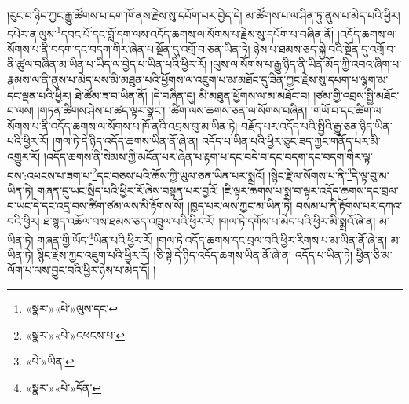 །རུང་བ་ཉིད་ཀྱང་རྒྱུ་ཚོགས་པ་དག་ཁོ་ནས་རྗེས་སུ་དཔོག་པར་བྱེད་དེ། མ་ཚོགས་པ་ལ་ཤིན་ཏུ་ནུས་པ་མེད་པའི་ཕྱིར། དཔེར་ན་ལུས་\footnote{«སྣར་»«པེ་»ལུས་དང་}དབང་པོ་དང་བློ་དག་ལས་འདོད་ཆགས་ལ་སོགས་པ་རྗེས་སུ་དཔོག་པ་བཞིན་ནོ། །འདོད་ཆགས་ལ་སོགས་པ་ནི་བདག་དང་བདག་གིར་ཞེན་པ་སྔོན་དུ་འགྲོ་བ་ཅན་ཡིན་ཏེ། ཉེས་པ་ཐམས་ཅད་སྐྱེ་བའི་སྔོན་དུ་འགྲོ་བ་ནི་ཚུལ་བཞིན་མ་ཡིན་པ་ཡིད་ལ་བྱེད་པ་ཡིན་པའི་ཕྱིར་རོ། །ལུས་ལ་སོགས་པ་རྒྱུ་ཉིད་ནི་ཡིན་མོད་ཀྱི་འབའ་ཞིག་པ་རྣམས་ལ་ནི་ནུས་པ་མེད་པས་མི་མཐུན་པའི་ཕྱོགས་ལ་འཇུག་པ་མ་མཐོང་དུ་ཟིན་ཀྱང་རྗེས་སུ་དཔག་པ་ལྷག་མ་དང་ལྡན་པའི་ཕྱིར། ཐེ་ཚོམ་ཟ་བ་ཡིན་ནོ། །དེ་བཞིན་དུ། མི་མཐུན་ཕྱོགས་ལ་མ་མཐོང་བ། །ཙམ་གྱི་འབྲས་སྤྱི་མཐོང་བ་ལས། །གཏན་ཚིགས་ཤེས་པ་ཚད་ལྟར་སྣང་། །ཚིག་ལས་ཆགས་ཅན་ལ་སོགས་བཞིན། །གཡོ་བ་དང་ཚིག་ལ་སོགས་པ་ནི་འདོད་ཆགས་ལ་སོགས་པ་ཁོ་ནའི་འབྲས་བུ་མ་ཡིན་ཏེ། བརྗོད་པར་འདོད་པའི་སྤྱིའི་རྒྱུ་ཅན་ཉིད་ཡིན་པའི་ཕྱིར་རོ། །གལ་ཏེ་དེ་ཉིད་འདོད་ཆགས་ཡིན་ནོ་ཞེ་ན། འདོད་པ་ཡིན་པའི་ཕྱིར་ཅུང་ཟད་ཀྱང་གནོད་པར་མི་འགྱུར་རོ། །འདོད་ཆགས་ནི་སེམས་ཀྱི་མངོན་པར་ཞེན་པ་རྟག་པ་དང་བདེ་བ་དང་བདག་དང་བདག་གིར་ལྟ་བས་:འཕངས་པ་ཟག་པ་\footnote{«སྣར་»«པེ་»འཕངས་པ་}དང་བཅས་པའི་ཆོས་ཀྱི་ཡུལ་ཅན་ཡིན་པར་སྨྲའོ། །སྙིང་རྗེ་ལ་སོགས་པ་ནི་\footnote{«པེ་»ཡིན་}དེ་ལྟ་བུ་མ་ཡིན་ཏེ། གཞན་དུ་ཡང་སྲིད་པའི་ཕྱིར་རོ་ཞེས་བསྟན་པར་བྱའོ། །ཇི་ལྟར་ཆགས་པ་སྨྲ་བ་ལྟར་འདོད་ཆགས་དང་བྲལ་བ་ཡང་དེ་དང་འདྲ་བས་ཚིག་ཙམ་ལས་མི་རྟོགས་སོ། །ཁྱད་པར་ལས་ཀྱང་མ་ཡིན་ཏེ། བསམ་པ་ནི་རྟོགས་པར་དཀའ་བའི་ཕྱིར། ཐ་སྙད་འཆོལ་བས་ཐམས་ཅད་འཁྲུལ་པའི་ཕྱིར་རོ། །གལ་ཏེ་དགོས་པ་མེད་པའི་ཕྱིར་མི་སྨྲའོ་ཞེ་ན། མ་ཡིན་ཏེ། གཞན་གྱི་ཡོད་\footnote{«སྣར་»«པེ་»དོན་}ཡིན་པའི་ཕྱིར་རོ། །གལ་ཏེ་འདོད་ཆགས་དང་བྲལ་བའི་ཕྱིར་རིགས་པ་མ་ཡིན་ནོ་ཞེ་ན། མ་ཡིན་ཏེ། སྙིང་རྗེས་ཀྱང་འཇུག་པའི་ཕྱིར་རོ། །ཅི་སྟེ་དེ་ཉིད་འདོད་ཆགས་ཡིན་ནོ་ཞེ་ན། འདོད་པ་ཡིན་ཏེ། ཕྱིན་ཅི་མ་ལོག་པ་ལས་བྱུང་བའི་ཕྱིར་ཉེས་པ་མེད་དོ། །
